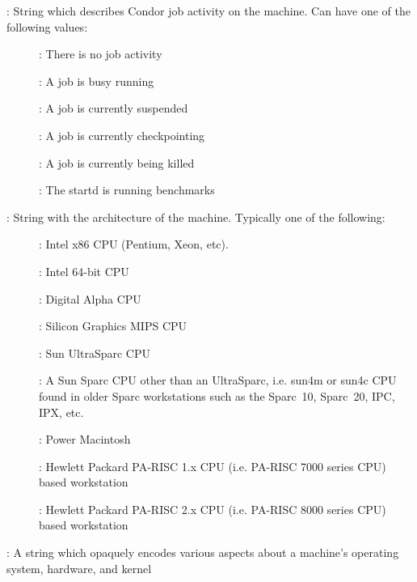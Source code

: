 \begin{description}
%
\item[\AdAttr{Activity}] : String which describes Condor job activity on the machine.
Can have one of the following values:
	\begin{description}
	\item[] : There is no job activity
	\item[] : A job is busy running
	\item[] : A job is currently suspended
	\item[] : A job is currently checkpointing
	\item[] : A job is currently being killed
	\item[] : The startd is running benchmarks
	\end{description}
%
\item[\AdAttr{Arch}] : String with the architecture of the machine.  Typically
one of the following: 
	\begin{description}
	\item[] : Intel x86 CPU (Pentium, Xeon, etc).
	\item[] : Intel 64-bit CPU
	\item[] : Digital Alpha CPU
	\item[] : Silicon Graphics MIPS CPU
	\item[] : Sun UltraSparc CPU
	\item[] : A Sun Sparc CPU other than an UltraSparc, i.e.
sun4m or sun4c CPU found in older Sparc workstations such as the Sparc~10, 
Sparc~20, IPC, IPX, etc.
	\item[] : Power Macintosh
	\item[] :  Hewlett Packard PA-RISC 1.x CPU (i.e. PA-RISC    
                      7000 series CPU) based workstation
	\item[] :  Hewlett Packard PA-RISC 2.x CPU (i.e. PA-RISC    
                      8000 series CPU) based workstation
	\end{description}
%
\item[\AdAttr{CheckpointPlatform}] : A string which opaquely encodes various
aspects about a machine's operating system, hardware, and kernel

\end{description}
